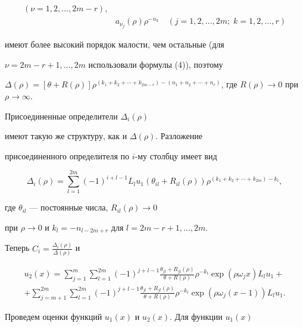 \begin{pf}
\begin{align*}
(\nu=1,2,\dotsc,2m-r), \\ 


& a_{\nu_j}(\rho)\rho^{-n_k} \quad 


(j=1,2,\dotsc,2m;\;k=1,2,\dotsc,r) 


\end{align*} 


имеют более высокий порядок малости, чем остальные (для 


$\nu=2m-r+1,\dotsc,2m$ использовали формулы (4)), поэтому 


$\Delta(\rho)=[\theta+R(\rho)]\rho^{(k_1+k_2+\dotsb+k_{2m-r})- 


(n_1+n_2+\dotsb+n_r)}$, где $R(\rho)\to 0$ при $\rho\to\infty$. 


 


Присоединенные определители $\Delta_i(\rho)$ 


имеют такую же структуру, как и $\Delta(\rho)$. Разложение 


присоединенного определителя по $i$-му столбцу имеет вид 


$$ 


\Delta_i(\rho)=\sum^{2m}_{l=1}(-1)^{i+l-1}L_lu_1 


(\theta_{il}+R_{il}(\rho))\rho^{(k_1+k_2+\dotsb+k_{2m})-k_l}, 


$$ 


где $\theta_{il}$ --- постоянные числа, $R_{il}(\rho)\to 0$ 


при $\rho\to 0$ и $k_l=-n_{l-2m+r}$ для $l=2m-r+1,\dotsc,2m$. 


Теперь $C_i=\frac{\Delta_i(\rho)}{\Delta(\rho)}$ и 


\begin{multline} 


u_2(x)=\sum^m_{j=1}\sum^{2m}_{l=1}(-1)^{j+l-1} 


\frac{\theta_{jl}+R_{jl}(\rho)}{\theta+R(\rho)} 


\rho^{-k_l}\exp(\rho\omega_jx)L_lu_1+\\ 


+\sum^{2m}_{j=m+1}\sum^{2m}_{l=1}(-1)^{j+l-1}


\frac{\theta_{jl}+R_{jl}(\rho)}{\theta+R(\rho)} 


\rho^{-k_l}\exp(\rho\omega_j(x-1))L_lu_1.


\end{multline} 


Проведем оценки функций $u_1(x)$ и $u_2(x)$. Для функции $u_1(x)$ 



\end{pf}
